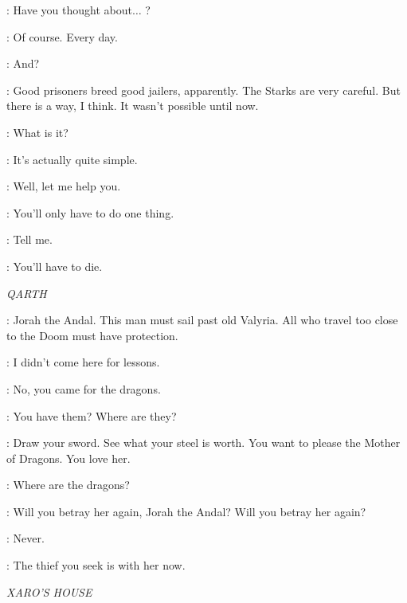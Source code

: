 \ALTON: Have you thought about$\ldots$ ?

\JAIME: Of course. Every day.

\ALTON: And?

\JAIME: Good prisoners breed good jailers, apparently. The Starks are very careful. But there is a way, I think. It wasn't possible until now.

\ALTON: What is it?

\JAIME: It's actually quite simple.

\ALTON: Well, let me help you.

\JAIME: You'll only have to do one thing.

\ALTON: Tell me.

\JAIME:  You'll have to die.




\scene

\textit{QARTH}


\QUAITHE: Jorah the Andal. This man must sail past old Valyria. All who travel too close to the Doom must have protection.

\JORAH: I didn't come here for lessons.

\QUAITHE: No, you came for the dragons.

\JORAH: You have them? Where are they?


\QUAITHE: Draw your sword. See what your steel is worth. You want to please the Mother of Dragons. You love her.

\JORAH: Where are the dragons?

\QUAITHE: Will you betray her again, Jorah the Andal? Will you betray her again?

\JORAH: Never.

\QUAITHE: The thief you seek is with her now.


\scene

\textit{XARO'S HOUSE}


